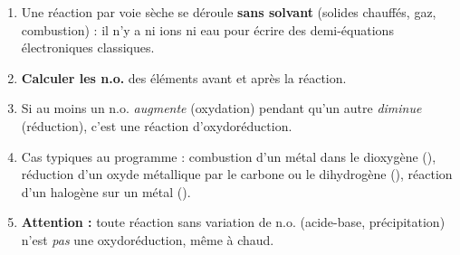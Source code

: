 \documentclass[11pt]{article}
\newcommand{\cle}[1]{{\popxbold\color{popdark}#1}}
\begin{document}
\begin{methode}
\begin{enumerate}
\item Une réaction \cle{par voie sèche} se déroule \textbf{sans solvant} (solides chauffés, gaz, combustion) : il n'y a ni ions  ni eau pour écrire des demi-équations électroniques classiques.
\item \textbf{Calculer les n.o.} des éléments avant et après la réaction.
\item Si au moins un n.o. \emph{augmente} (oxydation) pendant qu'un autre \emph{diminue} (réduction), c'est une réaction d'oxydoréduction.
\item Cas typiques au programme : combustion d'un métal dans le dioxygène (), réduction d'un oxyde métallique par le carbone ou le dihydrogène (), réaction d'un halogène sur un métal ().
\item \textbf{Attention :} toute réaction sans variation de n.o. (acide-base, précipitation) n'est \emph{pas} une oxydoréduction, même à chaud.
\end{enumerate}
\end{methode}
\end{document}
